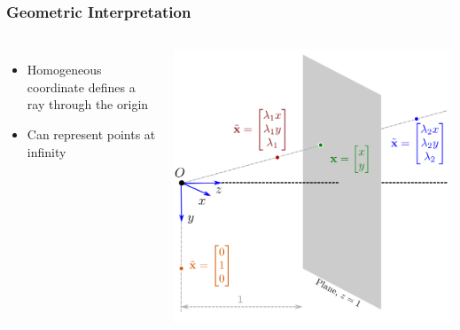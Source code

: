\documentclass{beamer}
\begin{document}
\begin{frame}
  \frametitle{Geometric Interpretation}
  \begin{columns}
    \begin{itemize}[<+->]
      \item Homogeneous coordinate defines a ray through the origin
      \item Can represent points at infinity
    \end{itemize}
      \includegraphics[width=1.0\textwidth]{fig/homogeneous.png}
    \end{columns}
\end{frame}
\end{document}
